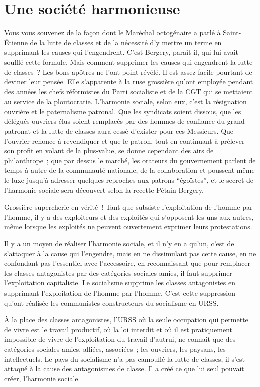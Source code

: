 \documentclass[french,twoside]{book} %
\begin{document}
\section[{Une société harmonieuse}]{Une société harmonieuse}
\noindent Vous vous souvenez de la façon dont le Maréchal octogénaire a parlé à Saint-Étienne de la lutte de classes et de la nécessité d’y mettre un terme en supprimant les causes qui l’engendrent. C’est Bergery, paraît-il, qui lui avait soufflé cette formule. Mais comment supprimer les causes qui engendrent la lutte de classes ? Les bons apôtres ne l’ont point révélé. Il est assez facile pourtant de deviner leur pensée. Elle s’apparente à la ruse grossière qu’ont employée pendant des années les chefs réformistes du Parti socialiste et de la CGT qui se mettaient au service de la ploutocratie. L’harmonie sociale, selon eux, c’est la résignation ouvrière et le paternalisme patronal. Que les syndicats soient dissous, que les délégués ouvriers élus soient remplacés par des hommes de confiance du grand patronat et la lutte de classes aura cessé d’exister pour ces Messieurs. Que l’ouvrier renonce à revendiquer et que le patron, tout en continuant à prélever son profit en volant de la plus-value, se donne cependant des airs de philanthrope ; que par dessus le marché, les orateurs du gouvernement parlent de temps à autre de la communauté nationale, de la collaboration et poussent même le luxe jusqu’à adresser quelques reproches aux patrons “égoïstes”, et le secret de l’harmonie sociale sera découvert selon la recette Pétain-Bergery.\par
Grossière supercherie en vérité ! Tant que subsiste l’exploitation de l’homme par l’homme, il y a des exploiteurs et des exploités qui s’opposent les uns aux autres, même lorsque les exploités ne peuvent ouvertement exprimer leurs protestations.\par
Il y a un moyen de réaliser l’harmonie sociale, et il n’y en a qu’un, c’est de s’attaquer à la cause qui l’engendre, mais en ne dissimulant pas cette cause, en ne confondant pas l’essentiel avec l’accessoire, en reconnaissant que pour remplacer les classes antagonistes par des catégories sociales amies, il faut supprimer l’exploitation capitaliste. Le socialisme supprime les classes antagonistes en supprimant l’exploitation de l’homme par l’homme. C’est cette suppression qu’ont réalisée les communistes constructeurs du socialisme en URSS.\par
À la place des classes antagonistes, l’URSS où la seule occupation qui permette de vivre est le travail productif, où la loi interdit et où il est pratiquement impossible de vivre de l’exploitation du travail d’autrui, ne connait que des catégories sociales amies, alliées, associées ; les ouvriers, les paysans, les intellectuels. Le pays du socialisme n’a pas camouflé la lutte de classes, il s’est attaqué à la cause des antagonismes de classe. Il a créé ce que lui seul pouvait créer, l’harmonie sociale.
\end{document}
